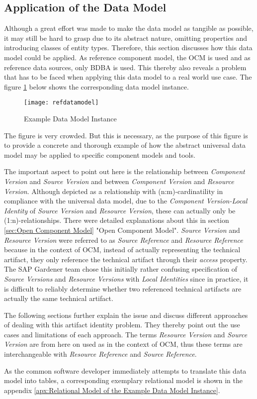 \subsection{Application of the Data Model} \label{sec:Application of the Data Model}
Although a great effort was made to make the data model as tangible as possible, it may still be hard to grasp due to its abstract nature, omitting properties and introducing classes of entity types. Therefore, this section discusses how this data model could be applied. As reference component model, the OCM is used and as reference data sources, only BDBA is used. This thereby also reveals a problem that has to be faced when applying this data model to a real world use case. The figure \ref{fig:RefDataModel} below shows the corresponding data model instance.\par

\begin{figure}[H]
	\centering
	\texttt{[image: refdatamodel]}
	\caption[Data Model Instance]{Example Data Model Instance }
	\label{fig:RefDataModel}
\end{figure}

The figure is very crowded. But this is necessary, as the purpose of this figure is to provide a concrete and thorough example of how the abstract universal data model may be applied to specific component models and tools.\par
The important aspect to point out here is the relationship between \emph{Component Version} and \emph{Source Version} and between \emph{Component Version} and \emph{Resource Version}. Although depicted as a relationship with (n:m)-cardinatility in compliance with the universal data model, due to the \emph{Component Version-Local Identity} of \emph{Source Version} and \emph{Resource Version}, these can actually only be (1:n)-relationships. There were detailed explanations about this in section \ref{sec:Open Component Model} "Open Component Model". \emph{Source Version} and \emph{Resource Version} were referred to as \emph{Source Reference} and \emph{Resource Reference} because in the context of OCM, instead of actually representing the technical artifact, they only reference the technical artifact through their \emph{access} property. The SAP Gardener team chose this initially rather confusing specification of \emph{Source Versions} and \emph{Resource Versions} with \emph{Local Identities} since in practice, it is difficult to reliably determine whether two referenced technical artifacts are actually the same technical artifact.\par 
The following sections further explain the issue and discuss different approaches of dealing with this artifact identity problem. They thereby point out the use cases and limitations of each approach. The terms \emph{Resource Version} and \emph{Source Version} are from here on used as in the context of OCM, thus these terms are interchangeable with \emph{Resource Reference} and \emph{Source Reference}.\par 
As the common software developer immediately attempts to translate this data model into tables, a corresponding exemplary relational model is shown in the appendix \ref{apx:Relational Model of the Example Data Model Instance}.  

